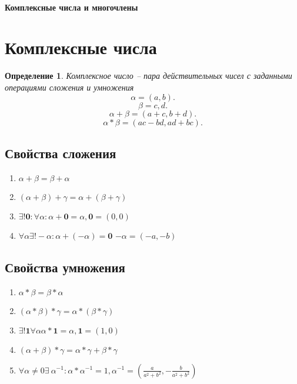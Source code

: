 \documentclass{scrartcl}
\newtheorem{definition}{Определение}
\begin{document}
    \paragraph{Комплексные числа и многочлены}
    \section{Комплексные числа}
    \begin{definition}
        Комплексное число -- пара действительных чисел с заданными операциями сложения и умножения
        \[
        \alpha = (a,b)
        .\] 
        \[
        \beta = c,d
        .\] 
        \[
        \alpha + \beta = (a + c, b + d)
        .\] 
        \[
        \alpha*\beta = (ac - bd,ad + bc)
        .\] 
    \end{definition}
    \subsection{Свойства сложения}
    \begin{enumerate}
        \item $\alpha + \beta = \beta + \alpha$
        \item  $(\alpha + \beta) + \gamma = \alpha + (\beta + \gamma)$
        \item $\exists ! \mathbf{0} : \forall  \alpha : \alpha + \mathbf{0} = \alpha, \mathbf{0} = (0,0)$
        \item $\forall  \alpha \exists ! -\alpha : \alpha + (-\alpha) = \mathbf{0}$ $-\alpha = (-a , -b)$
    \end{enumerate}
    \subsection{Свойства умножения}
    \begin{enumerate}
        \item $\alpha * \beta = \beta * \alpha$
        \item  $(\alpha *\beta) * \gamma = \alpha * (\beta * \gamma)$
        \item  $\exists! \mathbf{1} \forall \alpha \alpha * \mathbf{1} = \alpha, \mathbf{1} = (1,0)$
        \item $(\alpha + \beta)*\gamma = \alpha * \gamma + \beta*\gamma$
        \item  $\forall  \alpha \neq 0 \exists  ~ \alpha^{-1} : \alpha * \alpha^{-1}=  1, \alpha^{-1} = (\frac{a}{a^2 + b^2}, -\frac{b}{a^2 + b^2})$
    \end{enumerate}
\end{document}
